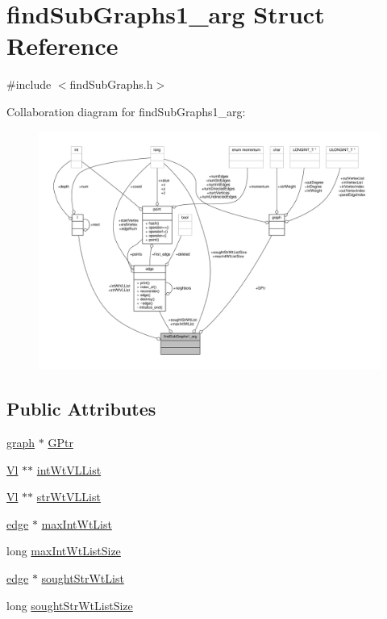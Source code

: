 \hypertarget{structfindSubGraphs1__arg}{\section{find\-Sub\-Graphs1\-\_\-arg Struct Reference}
\label{structfindSubGraphs1__arg}
}


{\ttfamily \#include $<$find\-Sub\-Graphs.\-h$>$}



Collaboration diagram for find\-Sub\-Graphs1\-\_\-arg\-:
\nopagebreak
\begin{figure}[H]
\begin{center}
\leavevmode
\includegraphics[width=350pt]{structfindSubGraphs1__arg__coll__graph}
\end{center}
\end{figure}
\subsection*{Public Attributes}
\begin{DoxyCompactItemize}
\item 
\hyperlink{structgraph}{graph} $\ast$ \hyperlink{structfindSubGraphs1__arg_a5914c74a6d897b24229eb9bbdc03dcc7}{G\-Ptr}
\item 
\hyperlink{defs_8h_af1ed7b0aa9a6575f3a0c0411ac27950e}{Vl} $\ast$$\ast$ \hyperlink{structfindSubGraphs1__arg_a5295126738ce9aa9de3f35faa343137f}{int\-Wt\-V\-L\-List}
\item 
\hyperlink{defs_8h_af1ed7b0aa9a6575f3a0c0411ac27950e}{Vl} $\ast$$\ast$ \hyperlink{structfindSubGraphs1__arg_a19475369818341a3a0045a22fae04abd}{str\-Wt\-V\-L\-List}
\item 
\hyperlink{classedge}{edge} $\ast$ \hyperlink{structfindSubGraphs1__arg_a24feb5e2d662355f79e9191db9a6fb67}{max\-Int\-Wt\-List}
\item 
long \hyperlink{structfindSubGraphs1__arg_a8a974aeb0df78af7d8b82d80ad1cb734}{max\-Int\-Wt\-List\-Size}
\item 
\hyperlink{classedge}{edge} $\ast$ \hyperlink{structfindSubGraphs1__arg_a3ab80bbe299f2ffc827cf3d3f8c38ecf}{sought\-Str\-Wt\-List}
\item 
long \hyperlink{structfindSubGraphs1__arg_a82ebeb72bc301011829c3ba2da39f096}{sought\-Str\-Wt\-List\-Size}
\end{DoxyCompactItemize}


